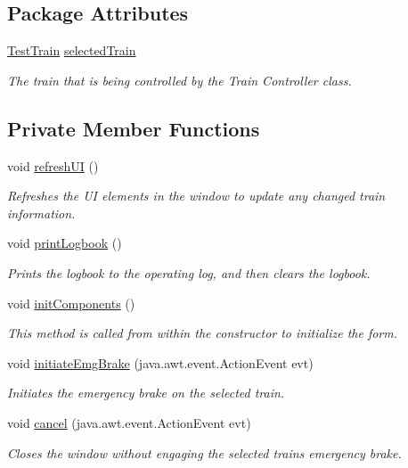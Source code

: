 \subsection*{Package Attributes}
\begin{DoxyCompactItemize}
\item 
\hyperlink{classTrainControllerComps_1_1TestTrain}{Test\+Train} \hyperlink{classTrainControllerComps_1_1TCEmergencyFrame_ac99b85a0ae38a4b60920f7ab057eb3c5}{selected\+Train}
\begin{DoxyCompactList}\small\item\em The train that is being controlled by the Train Controller class. \end{DoxyCompactList}\end{DoxyCompactItemize}
\subsection*{Private Member Functions}
\begin{DoxyCompactItemize}
\item 
void \hyperlink{classTrainControllerComps_1_1TCEmergencyFrame_a9314711626f90cd94306caa329311d60}{refresh\+UI} ()
\begin{DoxyCompactList}\small\item\em Refreshes the UI elements in the window to update any changed train information. \end{DoxyCompactList}\item 
void \hyperlink{classTrainControllerComps_1_1TCEmergencyFrame_a6a8c92fdc073a69ed2e86373e145d34a}{print\+Logbook} ()
\begin{DoxyCompactList}\small\item\em Prints the logbook to the operating log, and then clears the logbook. \end{DoxyCompactList}\item 
void \hyperlink{classTrainControllerComps_1_1TCEmergencyFrame_aa5cf83696387c257f09ff198718eaf33}{init\+Components} ()
\begin{DoxyCompactList}\small\item\em This method is called from within the constructor to initialize the form. \end{DoxyCompactList}\item 
void \hyperlink{classTrainControllerComps_1_1TCEmergencyFrame_a03d0a51aadee6e85a856d7f4e1d41677}{initiate\+Emg\+Brake} (java.\+awt.\+event.\+Action\+Event evt)
\begin{DoxyCompactList}\small\item\em Initiates the emergency brake on the selected train. \end{DoxyCompactList}\item 
void \hyperlink{classTrainControllerComps_1_1TCEmergencyFrame_a657c1dcd129d412134610a08c8d3cdfd}{cancel} (java.\+awt.\+event.\+Action\+Event evt)
\begin{DoxyCompactList}\small\item\em Closes the window without engaging the selected train\textquotesingle{}s emergency brake. \end{DoxyCompactList}\end{DoxyCompactItemize}
